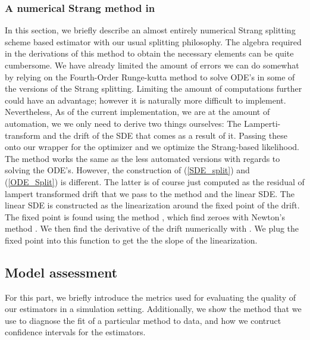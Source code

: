 \subsubsection{A numerical Strang method in }
In this section, we briefly describe an almost entirely numerical Strang splitting scheme based estimator with our usual splitting philosophy. The algebra required in the derivations of this method to obtain the necessary elements can be quite cumbersome. We have already limited the amount of errors we can do somewhat by relying on the Fourth-Order Runge-kutta method to solve ODE's in some of the versions of the Strang splitting. Limiting the amount of computations further could have an advantage; however it is naturally more difficult to implement. Nevertheless, As of the current implementation, we are at the amount of automation, we we only need to derive two things ourselves: The Lamperti-transform and the drift of the SDE that comes as a result of it. Passing these onto our wrapper for the optimizer and we optimize the Strang-based likelihood. \\
The method works the same as the less automated versions with regards to solving the ODE's. However, the construction of (\ref{SDE_split}) and (\ref{ODE_Split}) is different. The latter is of course just computed as the residual of lampert transformed drift that we pass to the method and the linear SDE. The linear SDE is constructed as the linearization around the fixed point of the drift. The fixed point is found using the method , which find zeroes with Newton's method \cite{nleqslv}. We then find the derivative of the drift numerically with  \cite{numDeriv}. We plug the fixed point into this function to get the the slope of the linearization.
\subsection{Model assessment}
For this part, we briefly introduce the metrics used for evaluating the quality of our estimators in a simulation setting. Additionally, we show the method that we use to diagnose the fit of a particular method to data, and how we contruct confidence intervals for the estimators.
